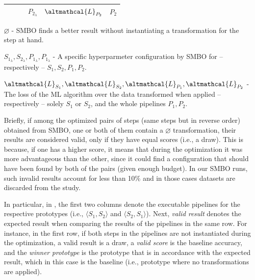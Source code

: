 \begin{table}[t]
\begin{threeparttable}
\begin{tabular}{lp{2.3cm}p{2.3cm}p{2cm}p{2cm}p{2.5cm}}
			& & & $P_{2_{\lambda}}$ & $\altmathcal{L}_{P_2}$ & $P_2$\\ \bottomrule
	\end{tabular}
	\begin{tablenotes}
	\footnotesize
	\item $\varnothing$ - SMBO finds a better result without instantiating a transformation for the step at hand.
	\item $S_{1_{\lambda}}, S_{2_{\lambda}}, P_{1_{\lambda}}, P_{1_{\lambda}}$ - A specific hyperparmeter configuration by SMBO for -- respectively -- $S_{1}, S_{2}, P_{1}, P_{2}$.
	\item $\altmathcal{L}_{S_1}, \altmathcal{L}_{S_2}, \altmathcal{L}_{P_1}, \altmathcal{L}_{P_2}$ - The loss of the ML algorithm over the data transformed when applied -- respectively -- solely $S_{1}$ or $S_{2}$, and the whole pipelines $P_{1}, P_{2}$.
	\end{tablenotes}
		\label{tbl:validation-rules}
	\end{threeparttable}
\end{table}

Briefly, if among the optimized pairs of steps (same steps but in reverse order) obtained from SMBO, one or both of them contain a $\varnothing$ transformation, their results are considered valid, only if they have equal scores (i.e., a draw).
This is because, if one has a higher score, it means that during the optimization it was more advantageous than the other, since it could find a configuration that should have been found by both of the pairs (given enough budget).
In our SMBO runs, such invalid results account for less than 10\% and in those cases datasets are discarded from the study.

In particular, in , the first two columns denote the executable pipelines for the respective prototypes (i.e., $\langle S_1, S_2 \rangle$ and $\langle S_2, S_1 \rangle$).
Next, \textit{valid result} denotes the expected result when comparing the results of the pipelines in the same row.
For instance, in the first row, if both steps in the pipelines are not instantiated during the optimization, a valid result is a draw, a \textit{valid score} is the baseline accuracy, and the \textit{winner prototype} is the prototype that is in accordance with the expected result, which in this case is the baseline (i.e., prototype where no transformations are applied).

